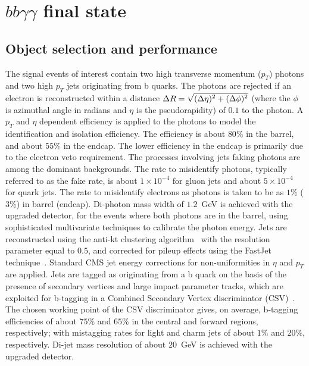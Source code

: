 \section{$bb\gamma\gamma$ final state}

\subsection{Object selection and performance}
\label{sec:objects}

% 
The signal events of interest contain two high transverse momentum ($p_{T}$) photons and two high $p_{T}$ jets originating from b quarks. The photons are rejected if an electron is reconstructed within a distance $\Delta R = \sqrt{\smash[b]{(\Delta\eta)^2 + (\Delta\phi)^2}}$ (where the $\phi$ is azimuthal angle in radians and $\eta$ is the pseudorapidity) of $0.1$ to the photon.  A $p_{T}$ and $\eta$ dependent efficiency is applied to the photons to model the identification and isolation efficiency. The efficiency is about $80\%$ in the barrel, and about $55\%$ in the endcap. The lower efficiency in the endcap is primarily due to the electron veto requirement. The processes involving jets faking photons are among the dominant backgrounds. The rate to misidentify photons, typically referred to as the fake rate, is about $1 \times 10^{-4}$ for gluon jets and about $5\times 10^{-4}$ for quark jets. The rate to misidentify electrons as photons is taken to be as $1\%$ ($3\%$) in barrel (endcap). Di-photon mass width of $1.2$~GeV is achieved with the upgraded detector, for the events where both photons are in the barrel, using sophisticated multivariate techniques to calibrate the photon energy.  
Jets are reconstructed using the anti-kt clustering algorithm~\cite{antikt} with the resolution parameter equal to $0.5$,
and corrected for pileup effects using the FastJet technique~\cite{CMS-PAS-JME-10-003,CMS-DP-2013-011}. Standard CMS jet energy corrections for non-uniformities in $\eta$ and $p_{T}$ are applied. Jets are tagged as originating from a b quark  on the basis of the presence of secondary vertices and large impact parameter tracks, which are exploited for b-tagging in a Combined Secondary Vertex discriminator (CSV)~\cite{CMS:BTagPaper,CMS-PAS-BTV-13-001,CMS-DP-2013-005}. The chosen working point of the CSV discriminator gives, on average, b-tagging efficiencies of about $75\%$ and $65\%$ in the central and forward regions, respectively; with mistagging rates for light and charm
jets of about $1\%$ and $20\%$, respectively. Di-jet mass resolution of about $20$~GeV is achieved with the upgraded detector. 

